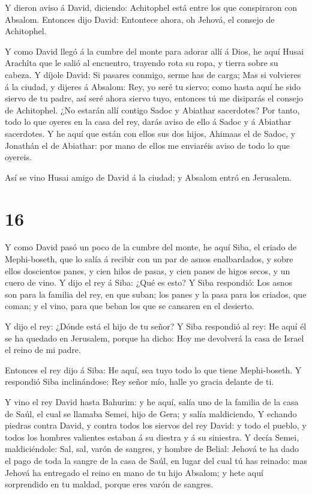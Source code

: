 Y dieron aviso á David, diciendo: Achitophel está entre
los que conspiraron con Absalom. Entonces dijo David: Entontece ahora,
oh Jehová, el consejo de Achitophel.

 Y como David llegó á la cumbre del monte para adorar allí
á Dios, he aquí Husai Arachîta que le salió al encuentro, trayendo rota
su ropa, y tierra sobre su cabeza.  Y díjole David: Si
pasares conmigo, serme has de carga;  Mas si volvieres á la
ciudad, y dijeres á Absalom: Rey, yo seré tu siervo; como hasta aquí he
sido siervo de tu padre, así seré ahora siervo tuyo, entonces tú me
disiparás el consejo de Achitophel.  ¿No estarán allí
contigo Sadoc y Abiathar sacerdotes? Por tanto, todo lo que oyeres en la
casa del rey, darás aviso de ello á Sadoc y á Abiathar sacerdotes.
 Y he aquí que están con ellos sus dos hijos, Ahimaas el de
Sadoc, y Jonathán el de Abiathar: por mano de ellos me enviaréis aviso
de todo lo que oyereis.

 Así se vino Husai amigo de David á la ciudad; y Absalom
entró en Jerusalem.

\hypertarget{section-15}{%
\section{16}\label{section-15}}

 Y como David pasó un poco de la cumbre del monte, he aquí
Siba, el criado de Mephi-boseth, que lo salía á recibir con un par de
asnos enalbardados, y sobre ellos doscientos panes, y cien hilos de
pasas, y cien panes de higos secos, y un cuero de vino.  Y
dijo el rey á Siba: ¿Qué es esto? Y Siba respondió: Los asnos son para
la familia del rey, en que suban; los panes y la pasa para los criados,
que coman; y el vino, para que beban los que se cansaren en el desierto.

 Y dijo el rey: ¿Dónde está el hijo de tu señor? Y Siba
respondió al rey: He aquí él se ha quedado en Jerusalem, porque ha
dicho: Hoy me devolverá la casa de Israel el reino de mi padre.

 Entonces el rey dijo á Siba: He aquí, sea tuyo todo lo que
tiene Mephi-boseth. Y respondió Siba inclinándose: Rey señor mío, halle
yo gracia delante de ti.

 Y vino el rey David hasta Bahurim: y he aquí, salía uno de
la familia de la casa de Saúl, el cual se llamaba Semei, hijo de Gera; y
salía maldiciendo,  Y echando piedras contra David, y contra
todos los siervos del rey David: y todo el pueblo, y todos los hombres
valientes estaban á su diestra y á su siniestra.  Y decía
Semei, maldiciéndole: Sal, sal, varón de sangres, y hombre de Belial:
 Jehová te ha dado el pago de toda la sangre de la casa de
Saúl, en lugar del cual tú has reinado: mas Jehová ha entregado el reino
en mano de tu hijo Absalom; y hete aquí sorprendido en tu maldad, porque
eres varón de sangres.

